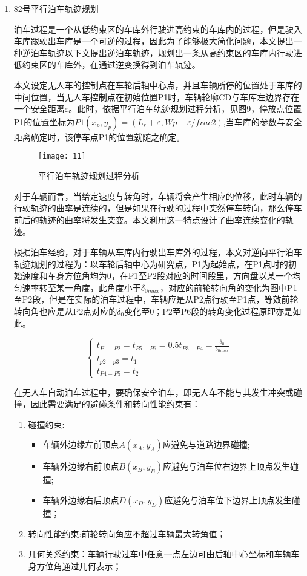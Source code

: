 \documentclass{MathorCupmodeling}
\begin{document}
\begin{enumerate}
		\begin{enumerate}
			\item 82号平行泊车轨迹规划
	
	泊车过程是一个从低约束区的车库外行驶进高约束的车库内的过程，但是驶入车库跟驶出车库是一个可逆的过程，因此为了能够极大简化问题，本文提出一种逆泊车轨迹以下文提出逆泊车轨迹，规划出一条从高约束区的车库内行驶进低约束区的车库外，在通过逆变换得到泊车轨迹\cite{label4}。

	本文设定无人车的控制点在车轮后轴中心点，并且车辆所停的位置处于车库的中间位置，当无人车控制点在初始位置P1时，车辆轮廓CD与车库左边界存在一个安全距离$\varepsilon$。此时，依据平行泊车轨迹规划过程分析，见图9，停放点位置P1的位置坐标为$P1(x_p,y_p)=(L_r+\varepsilon,{Wp-\varepsilon}/frac2)$,当车库的参数与安全距离确定时，该停车点P1的位置就随之确定。


	\begin{figure}[H]
		\centering
		\texttt{[image: 11]}
		\caption{平行泊车轨迹规划过程分析}
		\label{fig:circuit-diagram}
	\end{figure}

	对于车辆而言，当给定速度与转角时，车辆将会产生相应的位移，此时车辆的行驶轨迹的曲率是连续的，但是如果在行驶的过程中突然停车转向，那么停车前后的轨迹的曲率将发生突变。本文利用这一特点设计了曲率连续变化的轨迹。

	根据泊车经验，对于车辆从车库内行驶出车库外的过程，本文对逆向平行泊车轨迹规划的过程为：以车轮后轴中心为研究点，P1为起始点，在P1点时的初始速度和车身方位角均为0，在P1至P2段对应的时间段里，方向盘以某一个均匀速率转至某一角度，此角度小于$\delta_{0max}$，对应的前轮转向角的变化为图中P1至P2段，但是在实际的泊车过程中，车辆应是从P2点行驶至P1点，等效前轮转向角也应是从P2点对应的$\delta_0$变化至0；P2至P6段的转角变化过程原理亦是如此。

	\begin{equation}
		\left\{\begin{matrix}
			t_{P1-P2}=t_{P5-P6}=0.5t_{P3-P4}=\frac{\delta_0}{\delta_{0max}}
			\\ t_{p2-p3}=t_1
			\\ t_{P4-P5}=t_2
			\end{matrix}\right.
	\end{equation}

	在无人车自动泊车过程中，要确保安全泊车，即无人车不能与其发生冲突或碰撞，因此需要满足的避碰条件和转向性能约束有：
	\begin{enumerate}
		\item 碰撞约束:
		\begin{itemize}
			\item 车辆外边缘左前顶点$A(x_A,y_A)$应避免与道路边界碰撞;
			\item 车辆外边缘右前顶点$B(x_B,y_B)$应避免与泊车位右边界上顶点发生碰撞;
			\item 车辆外边缘右后顶点$D(x_D,y_D)$应避免与泊车位下边界上顶点发生碰撞；
		\end{itemize}
		\item 转向性能约束:前轮转向角应不超过车辆最大转角值；
		\item 几何关系约束：车辆行驶过车中任意一点左边可由后轴中心坐标和车辆车身方位角通过几何表示；
	\end{enumerate}


\end{enumerate}
\end{enumerate}
\end{document}
